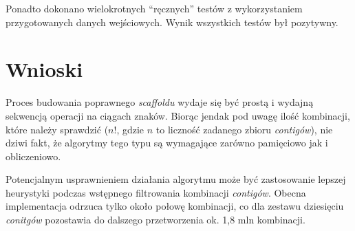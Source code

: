 \documentclass[a4paper,10pt]{article}
\begin{document}
Ponadto dokonano wielokrotnych ``ręcznych'' testów z wykorzystaniem przygotowanych danych wejściowych. Wynik wszystkich testów był pozytywny.

\section*{Wnioski}

Proces budowania poprawnego \emph{scaffoldu} wydaje się być prostą i wydajną sekwencją operacji na ciągach znaków.
Biorąc jendak pod uwagę ilość kombinacji, które należy sprawdzić ($n!$, gdzie $n$ to liczność zadanego zbioru \emph{contigów}), nie dziwi fakt, że algorytmy tego typu
są wymagające zarówno pamięciowo jak i obliczeniowo.

Potencjalnym usprawnieniem działania algorytmu może być zastosowanie lepszej heurystyki podczas wstępnego filtrowania kombinacji \emph{contigów}.
Obecna implementacja odrzuca tylko około połowę kombinacji, co dla zestawu dziesięciu \emph{conitgów} pozostawia do dalszego przetworzenia ok. 1,8 mln kombinacji.
\end{document}
